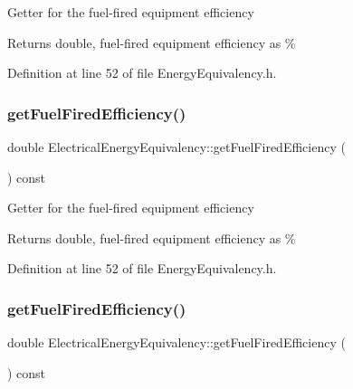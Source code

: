 Getter for the fuel-\/fired equipment efficiency

\begin{DoxyReturn}{Returns}
double, fuel-\/fired equipment efficiency as \% 
\end{DoxyReturn}


Definition at line 52 of file Energy\+Equivalency.\+h.

\mbox{\label{class_electrical_energy_equivalency_adc8def25354f6ba8c3479040507b0ea6}} 
\subsubsection{\texorpdfstring{get\+Fuel\+Fired\+Efficiency()}{getFuelFiredEfficiency()}\hspace{0.1cm}{\footnotesize\ttfamily [2/3]}}
{\footnotesize\ttfamily double Electrical\+Energy\+Equivalency\+::get\+Fuel\+Fired\+Efficiency (\begin{DoxyParamCaption}{ }\end{DoxyParamCaption}) const\hspace{0.3cm}{\ttfamily [inline]}}

Getter for the fuel-\/fired equipment efficiency

\begin{DoxyReturn}{Returns}
double, fuel-\/fired equipment efficiency as \% 
\end{DoxyReturn}


Definition at line 52 of file Energy\+Equivalency.\+h.

\mbox{\label{class_electrical_energy_equivalency_adc8def25354f6ba8c3479040507b0ea6}} 
\subsubsection{\texorpdfstring{get\+Fuel\+Fired\+Efficiency()}{getFuelFiredEfficiency()}\hspace{0.1cm}{\footnotesize\ttfamily [3/3]}}
{\footnotesize\ttfamily double Electrical\+Energy\+Equivalency\+::get\+Fuel\+Fired\+Efficiency (\begin{DoxyParamCaption}{ }\end{DoxyParamCaption}) const\hspace{0.3cm}{\ttfamily [inline]}}

